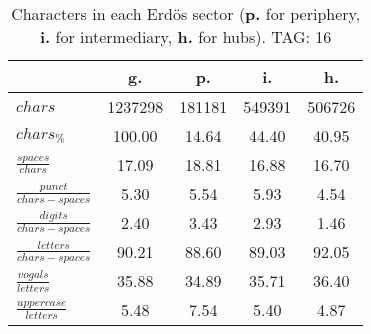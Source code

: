 \begin{table}[h!]
\begin{center}
\begin{tabular}{| l || c | c | c | c |}\hline
 & {\bf g.} & {\bf p.} & {\bf i.} & {\bf h.} \\\hline\hline
$chars$ & 1237298  & 181181  & 549391  & 506726 \\
$chars_{\%}$ & 100.00  & 14.64  & 44.40  & 40.95 \\\hline
$\frac{spaces}{chars}$ & 17.09  & 18.81  & 16.88  & 16.70 \\
$\frac{punct}{chars-spaces}$ & 5.30  & 5.54  & 5.93  & 4.54 \\
$\frac{digits}{chars-spaces}$ & 2.40  & 3.43  & 2.93  & 1.46 \\\hline
$\frac{letters}{chars-spaces}$ & 90.21  & 88.60  & 89.03  & 92.05 \\
$\frac{vogals}{letters}$ & 35.88  & 34.89  & 35.71  & 36.40 \\
$\frac{uppercase}{letters}$ & 5.48  & 7.54  & 5.40  & 4.87 \\\hline
\end{tabular}
\caption{Characters in each Erd\"os sector ({{\bf p.}} for periphery, {{\bf i.}} for intermediary, 
    {{\bf h.}} for hubs). TAG: 16}
\end{center}
\end{table}